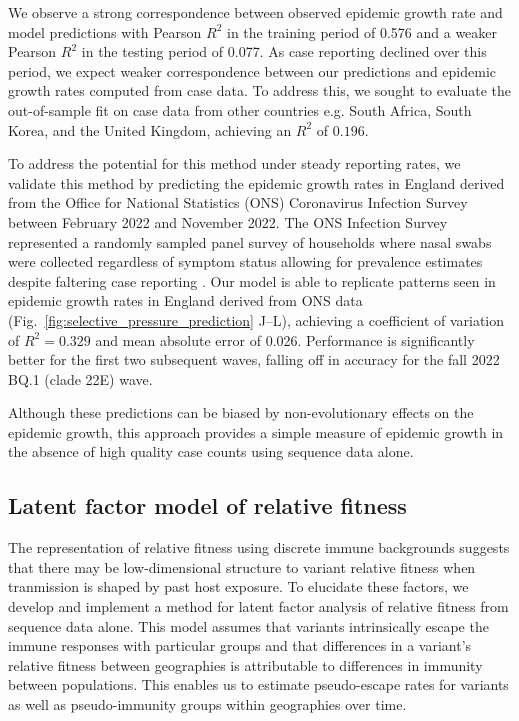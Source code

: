 \documentclass[11pt,oneside,letterpaper]{article}
\begin{document}
We observe a strong correspondence between observed epidemic growth rate and model predictions with Pearson $R^2$ in the training period of 0.576 and a weaker Pearson $R^2$ in the testing period of 0.077.
As case reporting declined over this period, we expect weaker correspondence between our predictions and epidemic growth rates computed from case data.
To address this, we sought to evaluate the out-of-sample fit on case data from other countries e.g. South Africa, South Korea, and the United Kingdom, achieving an $R^2$ of $0.196$.

To address the potential for this method under steady reporting rates, we validate this method by predicting the epidemic growth rates in England derived from the Office for National Statistics (ONS) Coronavirus Infection Survey between February 2022 and November 2022.
The ONS Infection Survey represented a randomly sampled panel survey of households where nasal swabs were collected regardless of symptom status allowing for prevalence estimates despite faltering case reporting \cite{pouwels2021community}.
Our model is able to replicate patterns seen in epidemic growth rates in England derived from ONS data (Fig.~\ref{fig:selective_pressure_prediction} J--L), achieving a coefficient of variation of $R^2 = 0.329$ and mean absolute error of 0.026.
Performance is significantly better for the first two subsequent waves, falling off in accuracy for the fall 2022 BQ.1 (clade 22E) wave.

Although these predictions can be biased by non-evolutionary effects on the epidemic growth, this approach provides a simple measure of epidemic growth in the absence of high quality case counts using sequence data alone.

\subsection*{Latent factor model of relative fitness}

The representation of relative fitness using discrete immune backgrounds suggests that there may be low-dimensional structure to variant relative fitness when tranmission is shaped by past host exposure.
To elucidate these factors, we develop and implement a method for latent factor analysis of relative fitness from sequence data alone.
This model assumes that variants intrinsically escape the immune responses with particular groups and that differences in a variant's relative fitness between geographies is attributable to differences in immunity between populations.
This enables us to estimate pseudo-escape rates for variants as well as pseudo-immunity groups within geographies over time.
\end{document}
